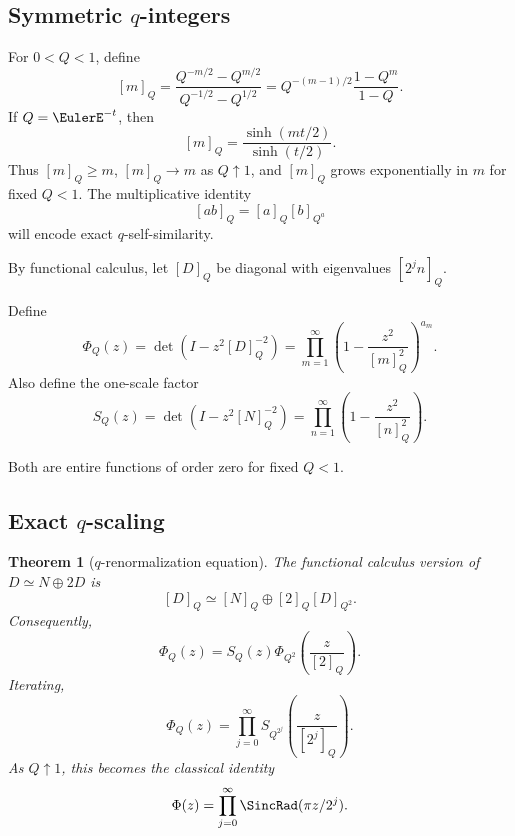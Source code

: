 \documentclass[11pt]{article}
\numberwithin{equation}{section}
\newtheorem{theorem}{Theorem}[section]
\theoremstyle{definition}
\theoremstyle{remark}
\begin{document}
\subsection{Symmetric $q$-integers}

For $0<Q<1$, define
\begin{equation}\label{p7:eq:q-int}
 [m]_Q=\frac{Q^{-m/2}-Q^{m/2}}{Q^{-1/2}-Q^{1/2}}
 =Q^{-(m-1)/2}\frac{1-Q^m}{1-Q}.
\end{equation}
If $Q=\EulerE^{-t}$, then
\begin{equation}\label{p7:eq:q-int-sinh}
 [m]_Q=\frac{\sinh(mt/2)}{\sinh(t/2)}.
\end{equation}
Thus $[m]_Q\ge m$, $[m]_Q\to m$ as $Q\uparrow1$, and $[m]_Q$ grows exponentially in $m$ for fixed $Q<1$.  The multiplicative identity
\begin{equation}\label{p7:eq:q-int-mult}
 [ab]_Q=[a]_Q[b]_{Q^a}
\end{equation}
will encode exact $q$-self-similarity.

By functional calculus, let $[D]_Q$ be diagonal with eigenvalues $[2^jn]_Q$.

\begin{definition}\label{p7:def:PhiQ}
Define
\begin{equation}\label{p7:eq:PhiQ}
 \boxed{\ \Phi_Q(z)=\det(I-z^2[D]_Q^{-2})
 =\prod_{m=1}^{\infty}
 \left(1-\frac{z^2}{[m]_Q^2}\right)^{a_m}.\ }
\end{equation}
Also define the one-scale factor
\begin{equation}\label{p7:eq:SQ}
 S_Q(z)=\det(I-z^2[N]_Q^{-2})
 =\prod_{n=1}^{\infty}\left(1-\frac{z^2}{[n]_Q^2}\right).
\end{equation}
\end{definition}
Both are entire functions of order zero for fixed $Q<1$.

\subsection{Exact $q$-scaling}

\begin{theorem}[$q$-renormalization equation]\label{p7:thm:q-scaling}
The functional calculus version of $D\simeq N\oplus2D$ is
\begin{equation}\label{p7:eq:qD-decomp}
 [D]_Q\simeq[N]_Q\oplus[2]_Q[D]_{Q^2}.
\end{equation}
Consequently,
\begin{equation}\label{p7:eq:PhiQ-scale}
 \boxed{\ \Phi_Q(z)=S_Q(z)
 \Phi_{Q^2}\!\left(\frac{z}{[2]_Q}\right).\ }
\end{equation}
Iterating,
\begin{equation}\label{p7:eq:PhiQ-scale-iter}
 \boxed{\ \Phi_Q(z)=\prod_{j=0}^{\infty}
 S_{Q^{2^j}}\!\left(\frac{z}{[2^j]_Q}\right).\ }
\end{equation}
As $Q\uparrow1$, this becomes the classical identity
\[
 \Phi(z)=\prod_{j=0}^{\infty}\SincRad(\pi z/2^j).
\]
\end{theorem}
\end{document}
